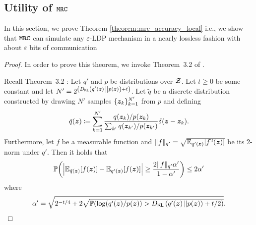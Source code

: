 \subsection{Utility of \texorpdfstring{$\texttt{MRC}$}{MRC}}\label{appendix:utility_mrc}
In this section, we prove Theorem \ref{theorem:mrc_accuracy_local} i.e., we show that $\texttt{MRC}$ can simulate any $\varepsilon$-LDP mechanism in a nearly lossless fashion with about $\varepsilon$ bits of communication
\mrcaccuracylocal*
\begin{proof}
In order to prove this theorem, we invoke Theorem~3.2 of \citet{HPHJ19}.

Recall Theorem~3.2 \citep{HPHJ19}: Let $q'$ and $p$ be distributions over $\mathcal{Z}$. Let $t \geq 0$ be some constant and let $N' = 2^{\left( {D}_{\mathsf{KL}}\left( q'({\boldsymbol{z}})\, \middle\Vert p({\boldsymbol{z}}) \right) + t \right)}$.
Let $\tilde{q}$ be a discrete distribution constructed by drawing $N'$ samples $\{{\boldsymbol{z}}_k\}_{k=1}^{N'}$ from $p$ and defining \begin{align}
    \tilde{q}({\boldsymbol{z}}) \coloneqq \sum_{k = 1}^{N'} \dfrac{q({\boldsymbol{z}}_k)/p({\boldsymbol{z}}_k)}{\sum_{k'}  q({\boldsymbol{z}}_{k'})/p({\boldsymbol{z}}_{k'})}\delta({\boldsymbol{z}} - {\boldsymbol{z}}_k).
\end{align}
Furthermore, let $f$ be a measurable function and $\|f\|_{q'} = \sqrt{\mathbb{E}_{q'({\boldsymbol{z}})}[f^2({\boldsymbol{z}})]}$ be its 2-norm under $q'$. Then it holds that 
\begin{align}
    \mathbb{P}\bigg(\Big|\mathbb{E}_{\tilde{q}({\boldsymbol{z}})}[f({\boldsymbol{z}})] - \mathbb{E}_{q'({\boldsymbol{z}})}[f({\boldsymbol{z}})] \Big| \geq \dfrac{2\|f\|_{q'} \alpha'}{1-\alpha'}\bigg) \leq 2\alpha'
\end{align}
where 
\begin{align}
\alpha' = \sqrt{2^{-t/4} + 2\sqrt{\mathbb{P}( \log(q'({\boldsymbol{z}})/p({\boldsymbol{z}})) > {D}_{\mathsf{KL}}\left( q'({\boldsymbol{z}})\, \middle\Vert p({\boldsymbol{z}}) \right) + t/2)}}.
\end{align}


\end{proof}
